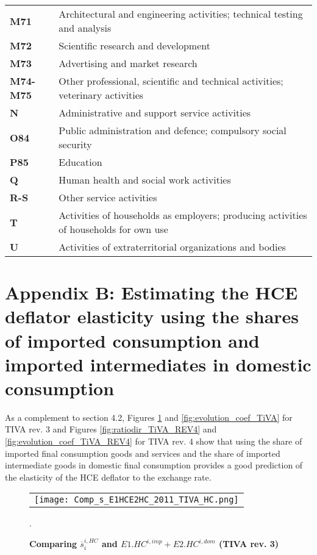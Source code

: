 \documentclass[11pt,a4paper]{article} %
\begin{document}
\begin{table}[H]
\begin{tabular}{ll}
\textbf{M71} &{Architectural and engineering activities; technical testing and analysis}\\
\textbf{M72} &{Scientific research and development}\\
\textbf{M73} &{Advertising and market research}\\
\textbf{M74-M75} &{Other professional, scientific and technical activities; veterinary activities}\\
\textbf{N} &{Administrative and support service activities}\\
\textbf{O84} &{Public administration and defence; compulsory social security}\\
\textbf{P85} &{Education}\\
\textbf{Q} &{Human health and social work activities}\\
\textbf{R-S} &{Other service activities}\\
\textbf{T} &{Activities of households as employers; producing activities of households for own use}\\
\textbf{U} &{Activities of extraterritorial organizations and bodies}\\
  	\end{tabular}
\label{tab:wiodindustries}
\end{table}

\newpage
\section*{Appendix B: Estimating the HCE deflator elasticity using the shares of imported consumption and imported intermediates in domestic consumption} \label{AppendixFonctionLinéaireTIVA}

As a complement to section 4.2, Figures \ref{fig:ratiodir_TiVA} and \ref{fig:evolution_coef_TiVA} for TIVA rev. 3 and Figures \ref{fig:ratiodir_TiVA_REV4} and \ref{fig:evolution_coef_TiVA_REV4} for TIVA rev. 4 show that using the share of imported final consumption goods and services and the share of imported intermediate goods in domestic final consumption provides a good prediction of the elasticity of the HCE deflator to the exchange rate.


\begin{figure}[H]
	\centering
	\caption{\footnotesize{\textbf{Comparing $\overline{s}_{i}^{i,HC}$ and $E1.HC^{i,imp}+E2.HC^{i,dom}$ (TIVA rev. 3)}}}
	\begin{tabular}{c}
		\texttt{[image: Comp\_s\_E1HCE2HC\_2011\_TIVA\_HC.png]}\\
	\end{tabular}
	\label{fig:ratiodir_TiVA}
	.
\end{figure}
\end{document}
